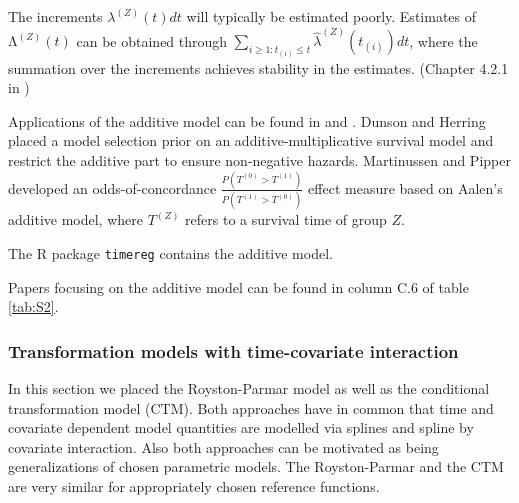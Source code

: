 \noindent 

\noindent The increments ${\lambda }^{\left(Z\right)}(t)dt$ will typically be estimated poorly. Estimates of ${\mathrm{\Lambda }}^{\left(Z\right)}(t)$ can be obtained through $\sum_{i\ge 1:t_{\left(i\right)}\le t}{{\widehat{\lambda }}^{\left(Z\right)}\left(t_{\left(i\right)}\right)dt}$, where the summation over the increments achieves stability in the estimates. (Chapter 4.2.1 in \cite{Aalen.2008})

\noindent 

\noindent Applications of the additive model can be found in \cite{Achilonu.2019} and \cite{Xie.2013}. Dunson and Herring \cite{Dunson.2005} placed a model selection prior on an additive-multiplicative survival model and restrict the additive part to ensure non-negative hazards. Martinussen and Pipper \cite{Martinussen.2013} developed an odds-of-concordance $\frac{P(T^{\left(0\right)}>T^{\left(1\right)})}{P(T^{\left(1\right)}>T^{\left(0\right)})}$ effect measure based on Aalen's additive model, where $T^{\left(Z\right)}$ refers to a survival time of group $Z$. 

\noindent 


\noindent The R package \texttt{timereg} contains the additive model. 

\noindent 

\noindent Papers focusing on the additive model can be found in column C.6 of table \ref{tab:S2}.

\noindent 

\subsubsection{Transformation models with time-covariate interaction} \label{trans}

\noindent 

\noindent In this section we placed the Royston-Parmar model as well as the conditional transformation model (CTM).
Both approaches have in common that time and covariate dependent model quantities are modelled via splines and spline by covariate interaction.
Also both approaches can be motivated as being generalizations of chosen parametric models.
The Royston-Parmar and the CTM are very similar for appropriately chosen reference functions.

